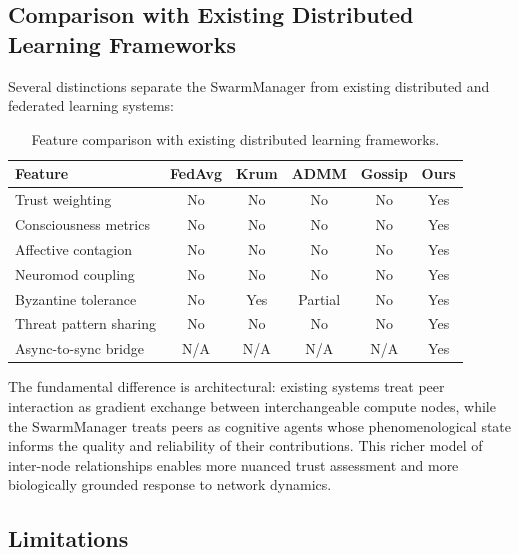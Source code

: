 \documentclass[11pt,a4paper]{article}
\begin{document}
\subsection{Comparison with Existing Distributed Learning Frameworks}

Several distinctions separate the SwarmManager from existing distributed and federated learning systems:

\begin{table}[h]
\centering
\caption{Feature comparison with existing distributed learning frameworks.}
\label{tab:comparison}
\begin{tabular}{p{3.5cm}ccccc}
\toprule
\textbf{Feature} & \textbf{FedAvg} & \textbf{Krum} & \textbf{ADMM} & \textbf{Gossip} & \textbf{Ours} \\
\midrule
Trust weighting & No & No & No & No & Yes \\
Consciousness metrics & No & No & No & No & Yes \\
Affective contagion & No & No & No & No & Yes \\
Neuromod coupling & No & No & No & No & Yes \\
Byzantine tolerance & No & Yes & Partial & No & Yes \\
Threat pattern sharing & No & No & No & No & Yes \\
Async-to-sync bridge & N/A & N/A & N/A & N/A & Yes \\
\bottomrule
\end{tabular}
\end{table}

The fundamental difference is architectural: existing systems treat peer interaction as gradient exchange between interchangeable compute nodes, while the SwarmManager treats peers as cognitive agents whose phenomenological state informs the quality and reliability of their contributions. This richer model of inter-node relationships enables more nuanced trust assessment and more biologically grounded response to network dynamics.

\subsection{Limitations}
\end{document}
